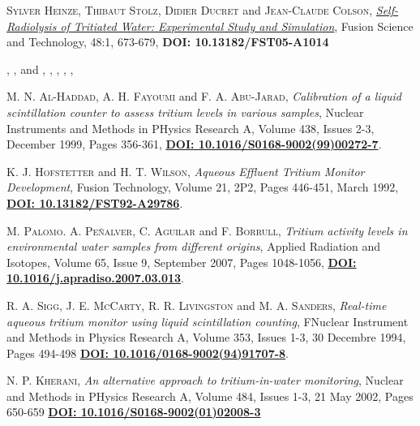 \begin{thebibliography}{100}
 \textsc{Sylver Heinze}, \textsc{Thibaut Stolz}, \textsc{Didier Ducret} and \textsc{Jean-Claude Colson},
\href{https://www.tandfonline.com/doi/abs/10.13182/FST05-A1014}{\textit{Self-Radiolysis of Tritiated Water: Experimental Study and Simulation}}, Fusion Science and Technology, 48:1, 673-679, \textbf{DOI: 10.13182/FST05-A1014}

 \textsc{}, \textsc{}, \textsc{} and \textsc{},
\textit{}, , , , \textbf{}

 \textsc{M. N. Al-Haddad}, \textsc{A. H. Fayoumi} and \textsc{F. A. Abu-Jarad},
\textit{Calibration of a liquid scintillation counter to assess tritium levels in various samples}, Nuclear Instruments and Methods in PHysics Research A, Volume 438, Issues 2-3, December 1999, Pages 356-361, \href{https://doi.org/10.1016/S0168-9002(99)00272-7}{\textbf{DOI: 10.1016/S0168-9002(99)00272-7}}.

 \textsc{K. J. Hofstetter} and \textsc{H. T. Wilson},
\textit{Aqueous Effluent Tritium Monitor Development}, Fusion Technology, Volume 21, 2P2, Pages 446-451, March 1992, \href{https://doi.org/10.13182/FST92-A29786}{\textbf{DOI: 10.13182/FST92-A29786}}.

 \textsc{M. Palomo}. \textsc{A. Peñalver}, \textsc{C. Aguilar} and \textsc{F. Borrull},
\textit{Tritium activity levels in environmental water samples from different origins}, Applied Radiation and Isotopes, Volume 65, Issue 9, September 2007, Pages 1048-1056, \href{https://doi.org/10.1016/j.apradiso.2007.03.013}{\textbf{DOI: 10.1016/j.apradiso.2007.03.013}}.

 \textsc{R. A. Sigg}, \textsc{J. E. McCarty}, \textsc{R. R. Livingston} and \textsc{M. A. Sanders},
\textit{Real-time aqueous tritium monitor using liquid scintillation counting}, FNuclear Instrument and Methods in Physics Research A, Volume 353, Issues 1-3, 30 Decembre 1994, Pages 494-498 \href{https://doi.org/10.1016/0168-9002(94)91707-8}{\textbf{DOI: 10.1016/0168-9002(94)91707-8}}.


 \textsc{N. P. Kherani},
\textit{An alternative approach to tritium-in-water monitoring}, Nuclear and Methods in PHysics Research A, Volume 484, Issues 1-3, 21 May 2002, Pages 650-659 \href{https://doi.org/10.1016/S0168-9002(01)02008-3}{\textbf{DOI: 10.1016/S0168-9002(01)02008-3}}


\end{thebibliography}
